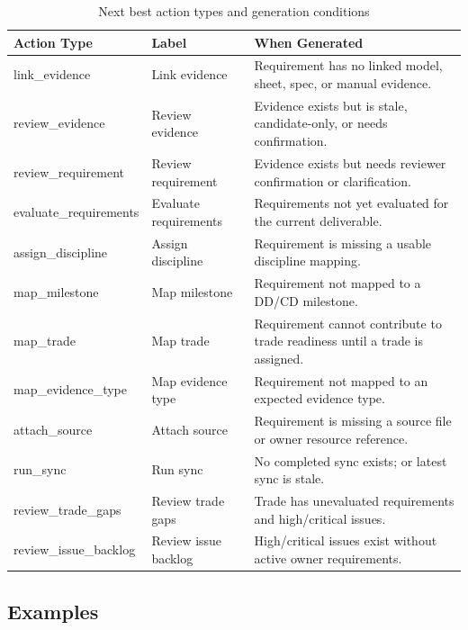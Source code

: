 \documentclass[10pt,letterpaper]{article}
\begin{document}
\begin{longtable}{p{1.5in}p{1.3in}p{3.5in}}
\caption{Next best action types and generation conditions}
\label{tab:next-actions}\\
\toprule
\textbf{Action Type} & \textbf{Label} & \textbf{When Generated} \\
\midrule
\endhead
link\_evidence & Link evidence & Requirement has no linked model, sheet, spec, or manual evidence. \\
review\_evidence & Review evidence & Evidence exists but is stale, candidate-only, or needs
  confirmation. \\
review\_requirement & Review requirement & Evidence exists but needs reviewer confirmation or
  clarification. \\
evaluate\_requirements & Evaluate requirements & Requirements not yet evaluated for the current
  deliverable. \\
assign\_discipline & Assign discipline & Requirement is missing a usable discipline mapping. \\
map\_milestone & Map milestone & Requirement not mapped to a DD/CD milestone. \\
map\_trade & Map trade & Requirement cannot contribute to trade readiness until a trade is assigned. \\
map\_evidence\_type & Map evidence type & Requirement not mapped to an expected evidence type. \\
attach\_source & Attach source & Requirement is missing a source file or owner resource reference. \\
run\_sync & Run sync & No completed sync exists; or latest sync is stale. \\
review\_trade\_gaps & Review trade gaps & Trade has unevaluated requirements and high/critical
  issues. \\
review\_issue\_backlog & Review issue backlog & High/critical issues exist without active owner
  requirements. \\
\bottomrule
\end{longtable}

\subsection{Examples}
\end{document}
